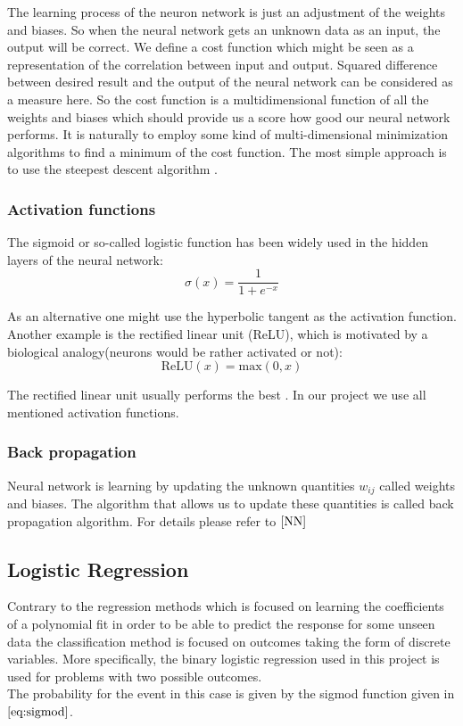 \documentclass[10pt]{article}
\begin{document}
The learning process of the neuron network is just an adjustment of the weights and biases. So when the neural network gets an unknown data as an input, the output will be correct. We define a cost function which might be seen as a representation of the correlation between input and output. Squared difference between desired result and the output of the neural network can be considered as a measure here. So the cost function is a multidimensional function of all the weights and biases which should provide us a score how good our neural network performs. It is naturally to employ some kind of multi-dimensional minimization algorithms to find a minimum of the cost function. The most simple approach is to use the steepest descent algorithm \cite{Metha}.


\subsubsection{Activation functions}
The sigmoid or so-called logistic function has been widely used
in the hidden layers of the neural network:
\begin{equation}\label{eq:sigmod}
\sigma (x) = \frac{1}{1 + e^{-x}}
\end{equation}

As an alternative one might use the hyperbolic tangent as the activation function. Another example is the rectified linear unit (ReLU), which is motivated by a biological analogy(neurons would be rather activated or not):
\begin{equation*}
\text{ReLU} (x) = \text{max}(0,x)
\end{equation*}

The rectified linear unit usually performs the best \cite{Metha}. In our project we use all mentioned activation functions.

\subsubsection{Back propagation}
Neural network is learning by updating the unknown quantities $w_{ij}$ called weights and biases. The algorithm that allows us to update these quantities is called back propagation algorithm. For details please refer to $\cite{NN}$

\subsection{Logistic Regression}
Contrary to the regression methods which is focused on learning the coefficients of a polynomial fit in order to be able to predict the response for some unseen data the classification method is focused on outcomes taking the form of discrete variables. More specifically, the binary logistic regression used in this project is used for problems with two possible outcomes. \\
The probability for the event in this case is given by the sigmod function given in $\ref{eq:sigmod}$. 
\end{document}
